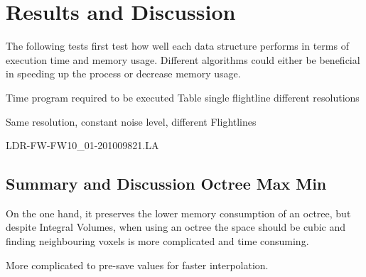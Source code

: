 \documentclass{subfiles}
\begin{document}
\section{Results and Discussion}

The following tests first test how well each data structure performs in terms of execution time and memory usage. 
Different algorithms could either be beneficial in speeding up the process or decrease memory usage. 


Time program required to be executed
Table single flightline different resolutions



Same resolution, constant noise level, different Flightlines



LDR-FW-FW10\_01-201009821.LA


\subsection{Summary and Discussion Octree Max Min}
On the one hand, it preserves the lower memory consumption of an octree, but despite Integral Volumes, when using an octree the space should be cubic and finding neighbouring voxels is more complicated and time consuming. 

More complicated to pre-save values for faster interpolation. 
\end{document}
